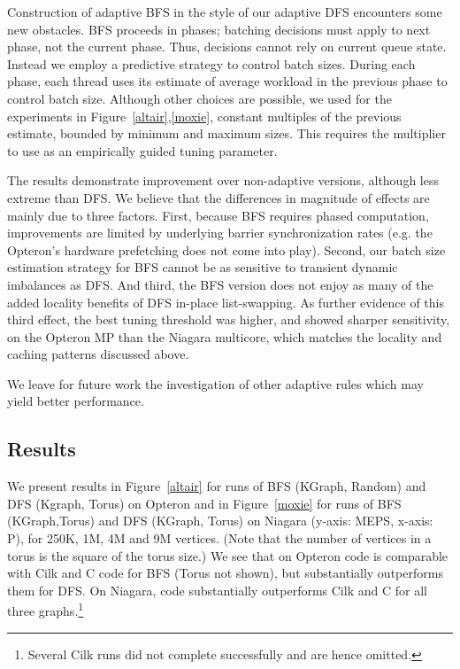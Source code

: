 
Construction of adaptive BFS in the style of our adaptive DFS
encounters some new obstacles.  BFS proceeds in phases; batching
decisions must apply to next phase, not the current phase. Thus,
decisions cannot rely on current queue state.  Instead we employ a
predictive strategy to control batch sizes. During each phase, each
thread uses its estimate of average workload in the previous phase to
control batch size. Although other choices are possible, we used for
the experiments in Figure~\ref{altair},\ref{moxie}, constant multiples of
the previous estimate, bounded by minimum and maximum sizes. This
requires the multiplier to use as an empirically guided tuning
parameter.

The results demonstrate improvement over non-adaptive versions,
although less extreme than DFS.  We believe that the differences in
magnitude of effects are mainly due to three factors. First, because
BFS requires phased computation, improvements are limited by
underlying barrier synchronization rates (e.g.{} the Opteron's hardware
prefetching does not come into play). Second, our batch size
estimation strategy for BFS cannot be as sensitive to transient
dynamic imbalances as DFS.  And third, the BFS version does not enjoy
as many of the added locality benefits of DFS in-place list-swapping.
As further evidence of this third effect, the best tuning threshold
was higher, and showed sharper sensitivity, on the Opteron MP than the
Niagara multicore, which matches the locality and caching patterns
discussed above.

We leave for future work the investigation of other adaptive rules which may yield better performance. 


\subsection{Results}



We present results in Figure~\ref{altair} for runs of BFS (KGraph,
Random) and DFS (Kgraph, Torus) on Opteron and in Figure~\ref{moxie}
for runs of BFS (KGraph,Torus) and DFS (KGraph, Torus) on Niagara
(y-axis: MEPS, x-axis: P), for 250K, 1M, 4M and 9M vertices.  (Note
that the number of vertices in a torus is the square of the torus
size.) We see that on Opteron \XWS{} code is comparable with Cilk and
C code for BFS (Torus not shown), but substantially outperforms them
for DFS. On Niagara, \XWS{} code substantially outperforms Cilk and C
for all three graphs.\footnote{Several Cilk runs did not complete
successfully and are hence omitted.}


